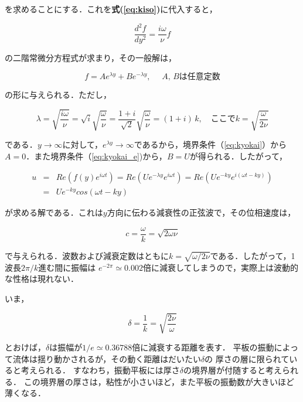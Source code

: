 を求めることにする．これを\textbf{式(\ref{eq:kiso})}に代入すると，

\begin{equation*}
\frac{d^2 f}{dy^2}=\frac{i \omega}{\nu}f
\end{equation*}

の二階常微分方程式が求まり，その一般解は，

\begin{equation*}
f=Ae^{\lambda y} + B e^{-\lambda y}, \mbox{　 }A, \, B\mbox{は任意定数}
\end{equation*}

の形に与えられる．ただし，

\begin{equation*}
\lambda=\sqrt{\frac{i \omega}{\nu}}
=\sqrt{i}\sqrt{\frac{\omega}{\nu}}
=\frac{1+i}{\sqrt{2}}\sqrt{\frac{\omega}{\nu}}
=(1+i)\,k, \mbox{　ここで}
k=\sqrt{\frac{\omega}{2\nu}}
\end{equation*}

である．$y \rightarrow \infty$に対して，$e^{\lambda y} \rightarrow \infty$であるから，境界条件（\ref{eq:kyokai}）から$A=0$．また境界条件（\ref{eq:kyokai_e})から，$B=U$が得られる．したがって，

\begin{eqnarray*}
u & = & Re \left(f(y)e^{i \omega t}\right) 
=Re\left(U e^{-\lambda y} e^{i\omega t }\right)
= Re \left(U e^{-ky}e^{i(\omega t - ky)}\right) \nonumber\\
 & = & U e^{-ky}cos (\omega t - ky)
\end{eqnarray*}

が求める解である．これは$y$方向に伝わる減衰性の正弦波で，その位相速度は，

\begin{equation*}
c=\frac{\omega}{k}=\sqrt{2 \omega \nu}
\end{equation*}

で与えられる．波数および減衰定数はともに$k=\sqrt{\omega/2\nu}$である．したがって，1波長$2 \pi/k$進む間に振幅は
$e^{-2\pi}\simeq0.002$倍に減衰してしまうので，実際上は波動的な性格は現れない．

いま，

\begin{equation}
\delta = \frac{1}{k} = \sqrt{\frac{2 \nu}{\omega}}
\label{eq:delta}
\end{equation}

とおけば，$\delta$は振幅が$1/e\simeq0.36788$倍に減衰する距離を表す．
平板の振動によって流体は揺り動かされるが，その動く距離はだいたい$\delta$の
厚さの層に限られていると考えられる．
すなわち，振動平板には厚さ$\delta$の境界層が付随すると考えられる．
この境界層の厚さは，粘性が小さいほど，また平板の振動数が大きいほど薄くなる．


